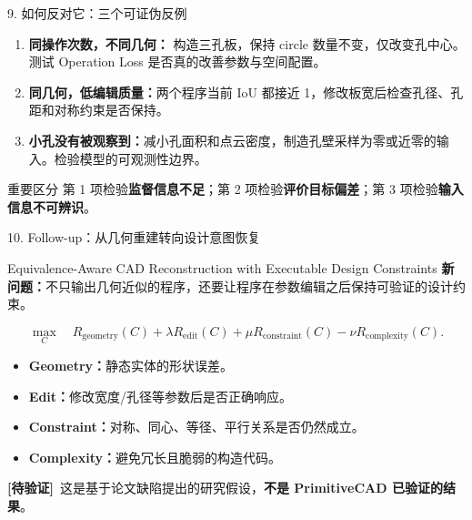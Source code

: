 \documentclass[aspectratio=169,11pt]{beamer}
\newcommand{\tagunknown}{\textcolor{warn}{\bfseries [待验证]}}
\newcommand{\tight}{\setlength{\itemsep}{0.24em}}
\begin{document}
\begin{frame}{9. 如何反对它：三个可证伪反例}
\small
\begin{enumerate}\setlength{\itemsep}{0.95em}
\item \textbf{同操作次数，不同几何：} 构造三孔板，保持 circle 数量不变，仅改变孔中心。测试 Operation Loss 是否真的改善参数与空间配置。
\item \textbf{同几何，低编辑质量：}两个程序当前 IoU 都接近 1，修改板宽后检查孔径、孔距和对称约束是否保持。
\item \textbf{小孔没有被观察到：}减小孔面积和点云密度，制造孔壁采样为零或近零的输入。检验模型的可观测性边界。
\end{enumerate}
\begin{block}{重要区分}
第 1 项检验\textbf{监督信息不足}；第 2 项检验\textbf{评价目标偏差}；第 3 项检验\textbf{输入信息不可辨识}。
\end{block}
\end{frame}

\begin{frame}{10. Follow-up：从几何重建转向设计意图恢复}
\begin{block}{Equivalence-Aware CAD Reconstruction with Executable Design Constraints}
\textbf{新问题：}不只输出几何近似的程序，还要让程序在参数编辑之后保持可验证的设计约束。
\end{block}
\small
\[
\max_C\quad R_{\mathrm{geometry}}(C)
+\lambda R_{\mathrm{edit}}(C)
+\mu R_{\mathrm{constraint}}(C)
-\nu R_{\mathrm{complexity}}(C).
\]
\begin{itemize}\tight
\item \textbf{Geometry：}静态实体的形状误差。
\item \textbf{Edit：}修改宽度/孔径等参数后是否正确响应。
\item \textbf{Constraint：}对称、同心、等径、平行关系是否仍然成立。
\item \textbf{Complexity：}避免冗长且脆弱的构造代码。
\end{itemize}
\tagunknown\ 这是基于论文缺陷提出的研究假设，\textbf{不是 PrimitiveCAD 已验证的结果}。
\end{frame}
\end{document}
